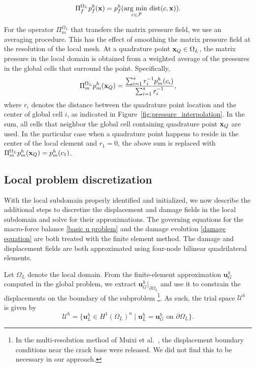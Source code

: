\begin{equation}
    \Pi^{\Omega_L}_f p_f^h({\bf{x}}) = p_f^h(\underset{c \in \mathcal{F}}{\text{arg min }}\text{dist}(c,{\bf{x}} )).
\end{equation}

For the operator $\Pi^{\Omega_L}_m$ that transfers the matrix pressure field, we use an averaging procedure.  This has the effect of smoothing the matrix pressure field at the resolution of the local mesh.  At a quadrature point ${\bf{x}}_Q \in \Omega_L$, the matrix pressure in the local domain is obtained from a weighted average of the pressures in the global cells that surround the point.  Specifically, 
\begin{equation}
    \Pi^{\Omega_L}_m p_m^h({\bf{x}}_Q) = \dfrac{\sum_{i=1}^s r^{-1}_ip_m^h(c_i)}{\sum_{i=1}^s r^{-1}_i},
\end{equation}
where $r_i$ denotes the distance between the quadrature point location and the center of global cell $i$, as indicated in Figure~\ref{fig:pressure_interpolation}.  In the sum, all cells that neighbor the global cell containing quadrature point ${\bf{x}}_Q$ are used.  In the particular case when a quadrature point happens to reside in the center of the local element and $r_1 = 0$, the above sum is replaced with   
$ \Pi^{\Omega_L}_mp_m^h({\bf{x}}_Q) = p^h_m (c_1)$.

\subsection{Local problem discretization}

With the local subdomain properly identified and initialized, we now describe the additional steps to discretize the displacement and damage fields in the local subdomain and solve for their approximations.
The governing equations for the macro-force balance \eqref{basic u problem} and the damage evolution \eqref{damage equation} are both treated with the finite element method.  The damage and displacement fields are both approximated using four-node bilinear quadrilateral elements. 

Let $\Omega_L$ denote the local domain. From the finite-element approximation $\textbf{u}_G^h$ computed in the global problem, we extract $\textbf{u}^h_G|_{\partial\Omega_L}$ and use it to constrain the displacements on the boundary of the subproblem \footnote{In the multi-resolution method of Muixi et al.\ \cite{muixi2021combined},  the displacement boundary conditions near the crack base were released. We did not find this to be necessary in our approach.}.  As such, the trial space $\boldsymbol{\mathcal{U}}^h$ is given by
\begin{equation}\label{disp subspace}
    \boldsymbol{\mathcal{U}}^h = \{ \textbf{u}_L^h \in H^1(\Omega_L)^n \mid \textbf{u}_L^h = \textbf{u}^h_G \text{ on } \partial\Omega_L \}.
\end{equation}

